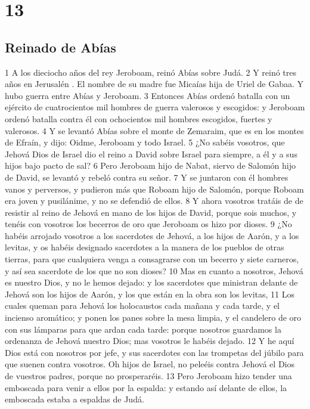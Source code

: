 \chapter{13}

\section*{Reinado de Abías}

1  A los dieciocho años del rey Jeroboam, reinó Abías sobre Judá.
2  Y reinó tres años en Jerusalén . El nombre de su madre fue Micaías hija de Uriel de Gabaa. Y hubo guerra entre Abías y Jeroboam.
3 Entonces Abías ordenó batalla con un ejército de cuatrocientos mil hombres de guerra valerosos y escogidos: y Jeroboam ordenó batalla contra él con ochocientos mil hombres escogidos, fuertes y valerosos.
4 Y se levantó Abías sobre el monte de Zemaraim, que es en los montes de Efraín, y dijo: Oidme, Jeroboam y todo Israel.
5 ¿No sabéis vosotros, que Jehová Dios de Israel dio el reino a David sobre Israel para siempre, a él y a sus hijos bajo pacto de sal?
6 Pero Jeroboam hijo de Nabat, siervo de Salomón hijo de David, se levantó y rebeló contra su señor.
7 Y se juntaron con él hombres vanos y perversos, y pudieron más que Roboam hijo de Salomón, porque Roboam era joven y pusilánime, y no se defendió de ellos. 
8 Y ahora vosotros tratáis de de resistir al reino de Jehová en mano de los hijos de David, porque sois muchos, y tenéis con vosotros los becerros de oro que Jeroboam os hizo por dioses.
9 ¿No habéis arrojado vosotros a los sacerdotes de Jehová, a los hijos de Aarón, y a los levitas, y os habéis designado sacerdotes a la manera de los pueblos de otras tierras, para que cualquiera venga a consagrarse con un becerro y siete carneros, y así sea sacerdote de los que no son dioses?
10 Mas en cuanto a nosotros, Jehová es nuestro Dios, y no le hemos dejado: y los sacerdotes que ministran delante de Jehová son los hijos de Aarón, y los que están en la obra son los levitas,
11 Los cuales queman para Jehová los holocaustos cada mañana y cada tarde, y el incienso aromático; y ponen los panes sobre la mesa limpia, y el candelero de oro con sus lámparas para que ardan cada tarde: porque nosotros guardamos la ordenanza de Jehová nuestro Dios; mas vosotros le habéis dejado.
12 Y he aquí Dios está con nosotros por jefe, y sus sacerdotes con las trompetas del júbilo para que suenen contra vosotros. Oh hijos de Israel, no peleéis contra Jehová el Dios de vuestros padres, porque no prosperaréis.
13 Pero Jeroboam hizo tender una emboscada para venir a ellos por la espalda: y estando así delante de ellos, la emboscada estaba a espaldas de Judá.
